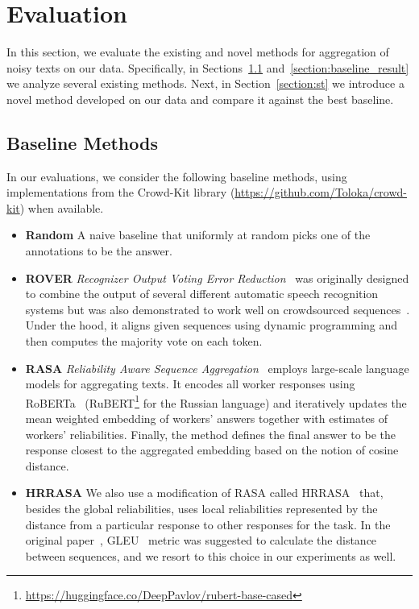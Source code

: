 \documentclass{article}
\begin{document}
\section{Evaluation}
\label{section:evaluation}

In this section, we evaluate the existing and novel methods for aggregation of noisy texts on our data. Specifically, in Sections~\ref{section:baseline_intro} and~\ref{section:baseline_result} we analyze several existing methods. Next, in Section~\ref{section:st} we introduce a novel method developed on our data and compare it against the best baseline.

\subsection{Baseline Methods}
\label{section:baseline_intro}

In our evaluations, we consider the following baseline methods, using implementations from the Crowd-Kit library (\url{https://github.com/Toloka/crowd-kit}) when available.

\begin{itemize}[itemsep=2pt, leftmargin=15pt, topsep=0pt]
    \item \textbf{Random} A naive baseline that uniformly at random picks one of the  annotations to be the answer. 
    
    \item \textbf{ROVER} \emph{Recognizer Output Voting Error Reduction}~\cite{fiscus97rover} was originally designed to combine the output of several different automatic speech recognition systems but was also demonstrated to work well on crowdsourced sequences~\citep{audhkhasi11accurate,evanini10nonnative,lee2011transcription,marge10turk}. Under the hood, it aligns given sequences using dynamic programming and then computes the majority vote on each token.

    \item \textbf{RASA} \emph{Reliability Aware Sequence Aggregation}~\cite{li19crowdwsa} employs large-scale language models for aggregating texts. It encodes all worker responses using RoBERTa~\cite{Liu19:roberta} (RuBERT\footnote{\url{https://huggingface.co/DeepPavlov/rubert-base-cased}} for the Russian language) and iteratively updates the mean weighted embedding of workers' answers together with estimates of workers' reliabilities. Finally, the method defines the final answer to be the response closest to the aggregated embedding based on the notion of cosine distance.

    \item \textbf{HRRASA} We also use a modification of RASA called HRRASA~\citep{li20hrrasa} that, besides the global reliabilities, uses local reliabilities represented by the distance from a particular response to other responses for the task. In the original paper~\citep{li20hrrasa}, GLEU~\cite{napoles-EtAl:2015:ACL-IJCNLP,napoles2016gleu} metric was suggested to calculate the distance between sequences, and we resort to this choice in our experiments as well.

\end{itemize}
\end{document}
